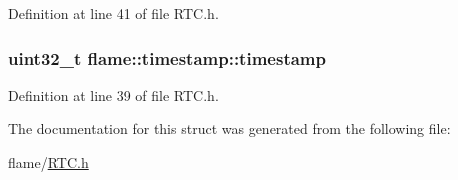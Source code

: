 Definition at line 41 of file R\-T\-C.\-h.

\hypertarget{structflame_1_1timestamp_a63da2e5e29c20d05ed80cab77b635399}{
\subsubsection[{timestamp}]{\setlength{\rightskip}{0pt plus 5cm}uint32\-\_\-t flame\-::timestamp\-::timestamp}}\label{structflame_1_1timestamp_a63da2e5e29c20d05ed80cab77b635399}


Definition at line 39 of file R\-T\-C.\-h.



The documentation for this struct was generated from the following file\-:\begin{DoxyCompactItemize}
\item 
flame/\hyperlink{_r_t_c_8h}{R\-T\-C.\-h}\end{DoxyCompactItemize}
